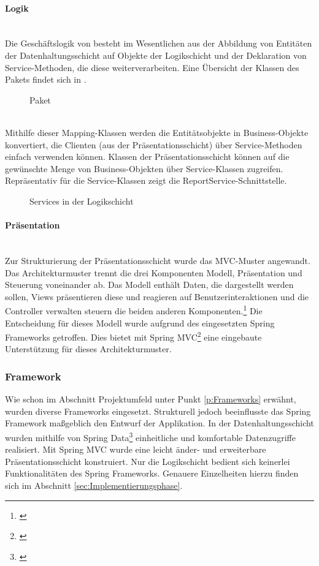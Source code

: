 \paragraph{Logik} ~\\
\label{p:Logik}
Die Geschäftslogik von \projektName besteht im Wesentlichen aus der Abbildung von Entitäten der Datenhaltungsschicht auf Objekte der Logikschicht und der Deklaration von Service-Methoden, die diese weiterverarbeiten. Eine Übersicht der Klassen des Pakets  findet sich in .
\begin{figure}[htb]
	\centering
	\caption{Paket }
	\label{fig:Mapping}
\end{figure}\\
Mithilfe dieser Mapping-Klassen werden die Entitätsobjekte in Business-Objekte konvertiert, die Clienten (aus der Präsentationsschicht) über Service-Methoden einfach verwenden können. Klassen der Präsentationsschicht können auf die gewünschte Menge von Business-Objekten über Service-Klassen zugreifen. Repräsentativ für die Service-Klassen zeigt  die ReportService-Schnittstelle.
\begin{figure}[htb]
	\centering
	\caption{Services in der Logikschicht}
	\label{fig:Logik}
\end{figure}

\paragraph{Präsentation} ~\\
\label{p:Praesentation}
Zur Strukturierung der Präsentationsschicht wurde das \ac{MVC}-Muster angewandt. Das Architekturmuster trennt die drei Komponenten Modell, Präsentation und Steuerung voneinander ab. Das Modell enthält Daten, die dargestellt werden sollen, Views präsentieren diese und reagieren auf Benutzerinteraktionen und die Controller verwalten \bzw steuern die beiden anderen Komponenten.\footnote{\Vgl \cite{wiki:mvc}}
Die Entscheidung für dieses Modell wurde aufgrund des eingesetzten Spring Frameworks getroffen. Dies bietet mit Spring MVC\footnote{\Vgl \cite{spring:mvc}} eine eingebaute Unterstützung für dieses Architekturmuster.

\subsubsection{Framework}
\label{sec:Framework}
Wie schon im Abschnitt Projektumfeld unter Punkt \ref{p:Frameworks} erwähnt, wurden diverse Frameworks eingesetzt. Strukturell jedoch beeinflusste das Spring Framework maßgeblich den Entwurf der Applikation. In der Datenhaltungsschicht wurden mithilfe von Spring Data\footnote{\Vgl \cite{spring:data}} einheitliche und komfortable Datenzugriffe realisiert. Mit Spring MVC wurde eine leicht änder- und erweiterbare Präsentationsschicht konstruiert. Nur die Logikschicht bedient sich keinerlei Funktionalitäten des Spring Frameworks. Genauere Einzelheiten hierzu finden sich im Abschnitt \ref{sec:Implementierungsphase}.

